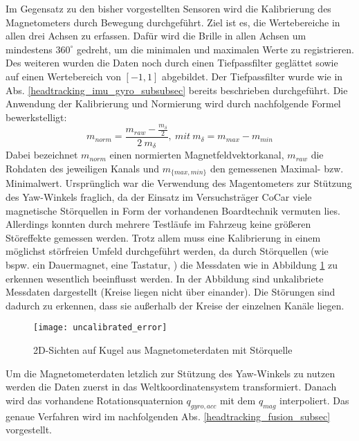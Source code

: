 Im Gegensatz zu den bisher vorgestellten Sensoren wird die Kalibrierung des Magnetometers durch Bewegung durchgeführt.
Ziel ist es, die Wertebereiche in allen drei Achsen zu erfassen.
Dafür wird die Brille in allen Achsen um mindestens $360^\circ$ gedreht, um die minimalen und maximalen Werte zu registrieren. 
Des weiteren wurden die Daten noch durch einen Tiefpassfilter geglättet sowie auf einen Wertebereich von $[-1,1]$ abgebildet.
 Der Tiefpassfilter wurde wie in Abs. \ref{headtracking_imu_gyro_subsubsec} bereits beschrieben durchgeführt. 
Die Anwendung der Kalibrierung und Normierung wird durch nachfolgende Formel bewerkstelligt:
\begin{equation}
    m_{norm} = \frac{m_{raw}- \frac{m_{\delta}}{2}}{2~m_{\delta}},~mit ~m_{\delta} = m_{max} - m_{min}
\end{equation}
Dabei bezeichnet $m_{norm}$ einen normierten Magnetfeldvektorkanal, $m_{raw}$ die Rohdaten des jeweiligen Kanals und $m_{\lbrace max, min\rbrace}$ den gemessenen Maximal- bzw. Minimalwert.
Ursprünglich war die Verwendung des Magentometers zur Stützung des Yaw-Winkels fraglich, da der Einsatz im Versuchsträger CoCar viele magnetische Störquellen in Form der vorhandenen Boardtechnik vermuten lies. 
Allerdings konnten durch mehrere Testläufe im Fahrzeug keine größeren Störeffekte gemessen werden.
Trotz allem muss eine Kalibrierung in einem möglichst störfreien Umfeld durchgeführt werden, da durch Störquellen (wie bspw. ein Dauermagnet, eine Tastatur, \oae) die Messdaten wie in Abbildung \ref{fig:uncalibrated_error} zu erkennen wesentlich beeinflusst werden. In der Abbildung sind unkalibriete Messdaten dargestellt (Kreise liegen nicht über einander). Die Störungen sind dadurch zu erkennen, dass sie außerhalb der Kreise der einzelnen Kanäle liegen.

\begin{figure}[ht]
\centering

    \texttt{[image: uncalibrated\_error]}
    \label{fig:uncalibrated_error}

\caption[]{2D-Sichten auf Kugel aus Magnetometerdaten mit Störquelle}
\label{fig:uncalibrated_error}
\end{figure}

Um die Magnetometerdaten letzlich zur Stützung des Yaw-Winkels zu nutzen werden die Daten zuerst in das Weltkoordinatensystem transformiert.
Danach wird das vorhandene Rotationsquaternion $q_{gyro,acc}$ mit dem $q_{mag}$ interpoliert.
Das genaue Verfahren wird im nachfolgenden Abs. \ref{headtracking_fusion_subsec}  vorgestellt.